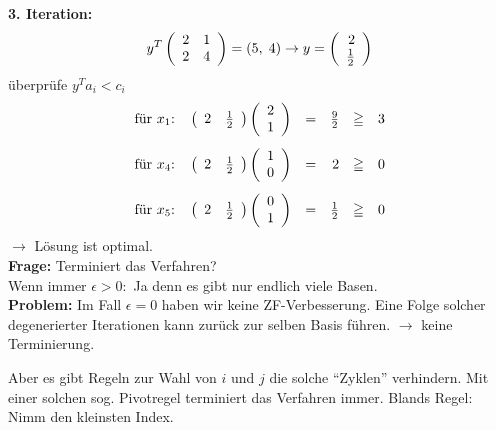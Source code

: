 {\bf 3. Iteration:}
\[y^{T} \mat{rr}{2&1\\2&4} = (5, \; 4) \rightarrow y =
\vect{2\\\frac{1}{2}}\]
überprüfe $y^{T}a_{i} < c_{i}$
\[\begin{array}{l@{:\hspace{4mm}}rcrcl}
\mbox{für } x_{1}& \mat{rr}{2&\frac{1}{2}} \vect{2\\1}&=&
\frac{9}{2}&\geqq&
3\vspace{3mm}\\
\mbox{für } x_{4}& \mat{rr}{2&\frac{1}{2}} \vect{1\\0} &=& 2&\geqq
&0\vspace{3mm} \\
\mbox{für } x_{5}& \mat{rr}{2&\frac{1}{2}} \vect{0\\1} &=& \frac{1}{2}&\geqq&
0\end{array}\]
$\rightarrow$ Lösung ist optimal.\\
{\bf Frage:} Terminiert das Verfahren?\\
Wenn immer $\epsilon > 0:$ Ja denn es gibt nur endlich viele Basen.\\
{\bf Problem:} Im Fall $\epsilon = 0$ haben wir keine ZF-Verbesserung. Eine
Folge solcher degenerierter Iterationen kann zurück zur selben Basis
führen. $\rightarrow$ keine Terminierung.

Aber es gibt Regeln zur Wahl von $i$ und $j$ die solche "`Zyklen"'
verhindern. Mit einer solchen sog. Pivotregel terminiert das Verfahren
immer. Blands Regel: Nimm den kleinsten Index.

